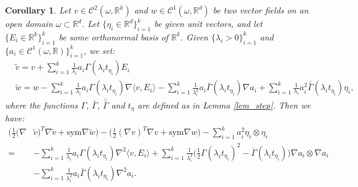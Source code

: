 \documentclass[reqno,twoside,11pt]{amsart}
\newcommand{\sym}{\mathrm{sym}}
\newcommand{\R}{\mathbb{R}}
\newcommand*{\dbar}[1]{\bar{\bar{#1}}}
\numberwithin{equation}{section}
\theoremstyle{plain}
\newtheorem{corollary}[theorem]{Corollary}
\theoremstyle{definition}
\begin{document}
\begin{corollary}\label{cor_indep}
Let $v\in \mathcal{C}^2(\omega, \R^{k})$ and $w\in
\mathcal{C}^1(\omega, \R^{d})$ be two vector fields on an open domain $\omega\subset\R^d$.
Let $\{\eta_i\in\R^d\}_{i=1}^k$ be given unit vectors, and let
$\{E_i\in \R^k\}_{i=1}^k$ be some orthonormal basis of $\R^k$. Given $\{\lambda_i>0\}_{i=1}^k$ and $\{a_i\in
\mathcal{C}^1(\omega,\R)\}_{i=1}^k$, we set:
\begin{equation*}
\begin{split}
&\tilde v = v + \sum_{i=1}^k\frac{1}{\lambda_i}a_i \Gamma(\lambda_i t_{\eta_i})E_i \\ 
& \tilde w= w -\sum_{i=1}^k\frac{1}{\lambda_i}a_i \Gamma(\lambda_i t_{\eta_i})\nabla \langle v, E_i\rangle - 
\sum_{i=1}^k\frac{1}{\lambda_i^2} a_i \bar\Gamma(\lambda_i t_{\eta_i})\nabla a_i
+ \sum_{i=1}^k\frac{1}{\lambda_i}a_i^2 \dbar\Gamma(\lambda_i t_{\eta_i})\eta_i,
\end{split}
\end{equation*}
where the functions $\Gamma$, $\bar\Gamma$, $\dbar\Gamma$ and $t_\eta$
are defined as in Lemma \ref{lem_step}. Then we have:
\begin{equation*}
\begin{split}
\big(\frac{1}{2}(\nabla & \tilde v)^T \nabla \tilde v + \sym\nabla \tilde w\big) - 
\big(\frac{1}{2}(\nabla v)^T \nabla v + \sym\nabla w\big) - \sum_{i=1}^ka_i^2\eta_i\otimes\eta_i
\\  = &  - \sum_{i=1}^k\frac{1}{\lambda_i} a_i \Gamma(\lambda_i t_{\eta_i})\nabla^2 \langle v, E_i\rangle +
\sum_{i=1}^k\frac{1}{\lambda_i^2}\big(\frac{1}{2}\Gamma(\lambda_i
t_{\eta_i})^2-\bar\Gamma(\lambda_i t_{\eta_i})\big) \nabla a_i\otimes\nabla a_i
\\ & - \sum_{i=1}^k \frac{1}{\lambda_i^2}a_i \bar\Gamma(\lambda_i t_{\eta_i})\nabla^2a_i.
\end{split}
\end{equation*}
\end{corollary}

\bigskip
\end{document}
